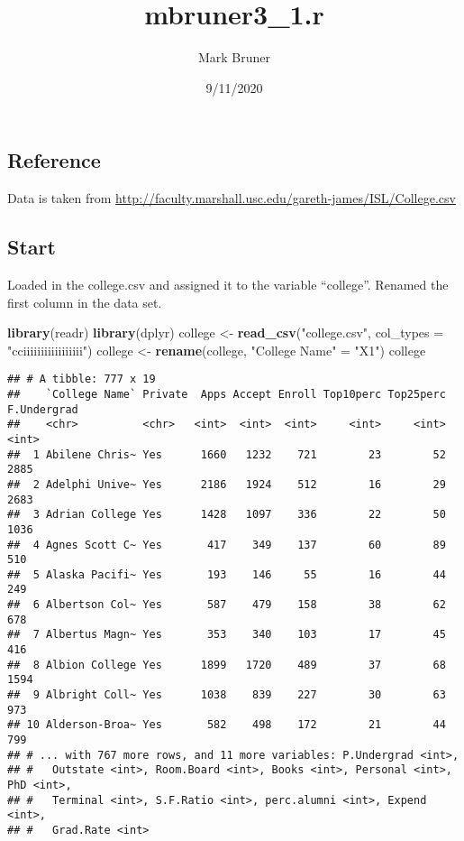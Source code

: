 \documentclass[
]{article}
\title{mbruner3\_1.r}
\author{Mark Bruner}
\date{9/11/2020}
\newenvironment{Shaded}{\begin{snugshade}}{\end{snugshade}}
\newcommand{\DataTypeTok}[1]{\textcolor[rgb]{0.13,0.29,0.53}{#1}}
\newcommand{\KeywordTok}[1]{\textcolor[rgb]{0.13,0.29,0.53}{\textbf{#1}}}
\newcommand{\NormalTok}[1]{#1}
\newcommand{\StringTok}[1]{\textcolor[rgb]{0.31,0.60,0.02}{#1}}
\begin{document}
\maketitle

\hypertarget{reference}{%
\subsection{Reference}\label{reference}}

Data is taken from
\url{http://faculty.marshall.usc.edu/gareth-james/ISL/College.csv}

\hypertarget{start}{%
\subsection{Start}\label{start}}

Loaded in the college.csv and assigned it to the variable ``college''.
Renamed the first column in the data set.

\begin{Shaded}
\begin{Highlighting}[]
\KeywordTok{library}\NormalTok{(readr)}
\KeywordTok{library}\NormalTok{(dplyr)}
\NormalTok{college <-}\StringTok{ }\KeywordTok{read_csv}\NormalTok{(}\StringTok{"college.csv"}\NormalTok{, }\DataTypeTok{col_types =} \StringTok{"cciiiiiiiiiiiiiiiii"}\NormalTok{)}
\NormalTok{college <-}\StringTok{ }\KeywordTok{rename}\NormalTok{(college, }\StringTok{"College Name"}\NormalTok{ =}\StringTok{ "X1"}\NormalTok{)}
\NormalTok{college }
\end{Highlighting}
\end{Shaded}

\begin{verbatim}
## # A tibble: 777 x 19
##    `College Name` Private  Apps Accept Enroll Top10perc Top25perc F.Undergrad
##    <chr>          <chr>   <int>  <int>  <int>     <int>     <int>       <int>
##  1 Abilene Chris~ Yes      1660   1232    721        23        52        2885
##  2 Adelphi Unive~ Yes      2186   1924    512        16        29        2683
##  3 Adrian College Yes      1428   1097    336        22        50        1036
##  4 Agnes Scott C~ Yes       417    349    137        60        89         510
##  5 Alaska Pacifi~ Yes       193    146     55        16        44         249
##  6 Albertson Col~ Yes       587    479    158        38        62         678
##  7 Albertus Magn~ Yes       353    340    103        17        45         416
##  8 Albion College Yes      1899   1720    489        37        68        1594
##  9 Albright Coll~ Yes      1038    839    227        30        63         973
## 10 Alderson-Broa~ Yes       582    498    172        21        44         799
## # ... with 767 more rows, and 11 more variables: P.Undergrad <int>,
## #   Outstate <int>, Room.Board <int>, Books <int>, Personal <int>, PhD <int>,
## #   Terminal <int>, S.F.Ratio <int>, perc.alumni <int>, Expend <int>,
## #   Grad.Rate <int>
\end{verbatim}
\end{document}
